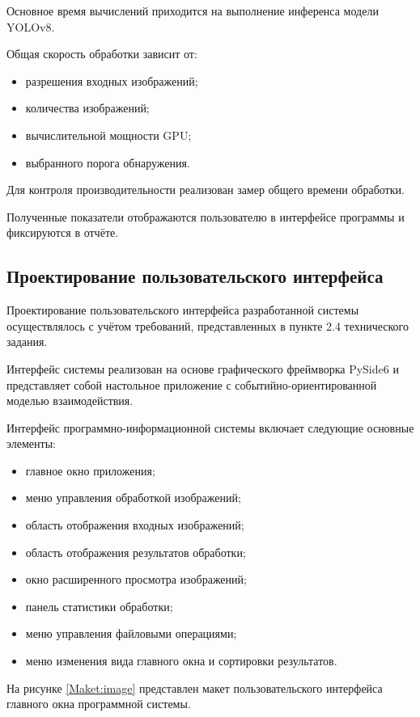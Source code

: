 Основное время вычислений приходится на выполнение инференса модели YOLOv8.

Общая скорость обработки зависит от:

\begin{itemize}
	\item разрешения входных изображений;
	\item количества изображений;
	\item вычислительной мощности GPU;
	\item выбранного порога обнаружения.
\end{itemize}

Для контроля производительности реализован замер общего времени обработки.

Полученные показатели отображаются пользователю в интерфейсе программы и фиксируются в отчёте.

\subsection{Проектирование пользовательского интерфейса}

Проектирование пользовательского интерфейса разработанной системы осуществлялось с учётом требований, представленных в пункте 2.4 технического задания.

Интерфейс системы реализован на основе графического фреймворка PySide6 и представляет собой настольное приложение с событийно-ориентированной моделью взаимодействия.

Интерфейс программно-информационной системы включает следующие основные элементы:

\begin{itemize}
	\item главное окно приложения;
	\item меню управления обработкой изображений;
	\item область отображения входных изображений;
	\item область отображения результатов обработки;
	\item окно расширенного просмотра изображений;
	\item панель статистики обработки;
	\item меню управления файловыми операциями;
	\item меню изменения вида главного окна и сортировки результатов.
\end{itemize}

На рисунке \ref{Maket:image} представлен макет пользовательского интерфейса главного окна программной системы.


